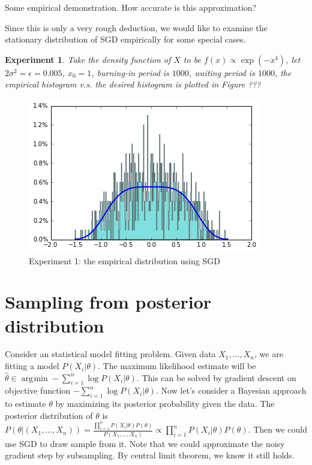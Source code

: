 \documentclass[preprint,12pt,3p]{elsarticle}
\DeclareMathOperator*{\argmin}{\arg\!\min}
\newtheorem{experiment}{Experiment}
\begin{document}
Some empirical demonstration. How accurate is this approximation?

Since this is only a very rough deduction, we would like to examine the stationary distribution of SGD empirically for some special cases.

\begin{experiment}
Take the density function of $X$ to be $f(x) \propto \exp(- x^4)$, let $2\sigma^2 = \epsilon = 0.005$, $x_0 = 1$, burning-in period is $1000$, waiting period is $1000$, the empirical histogram v.s. the desired histogram is plotted in Figure ???
\end{experiment}
\begin{figure}
    \centering
    \includegraphics{../figure/case1_step_0.005_iter_1e3.png}
    \caption{Experiment 1: the empirical distribution using SGD}
    \label{Fig:exp1}
\end{figure}
\section{Sampling from posterior distribution}
Consider an statistical model fitting problem. Given data $X_1,\ldots, X_n$, we are fitting a model $P(X_i|\theta)$. The maximum likelihood estimate will be $\hat{\theta} \in \argmin - \sum_{i=1}^n \log P(X_i|\theta)$. This can be solved by gradient descent on objective function $- \sum_{i=1}^n \log P(X_i|\theta)$. Now let's consider a Bayesian approach to estimate $\theta$ by maximizing its posterior probability given the data. The posterior distribution of $\theta$ is
$P(\theta|(X_1,\ldots, X_n)) = \frac{\prod_{i=1}^n P(X_i|\theta) P(\theta)}{P(X_1,\ldots, X_n)} \propto \prod_{i=1}^n P(X_i|\theta) P(\theta)$. Then we could use SGD to draw sample from it. Note that we could approximate the noisy gradient step by subsampling. By central limit theorem, we know it still holds.
\end{document}

